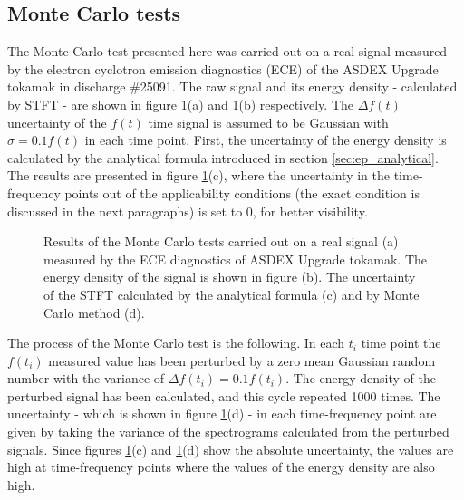 \documentclass[a4paper,12pt,oneside]{article}
\begin{document}
\subsection{Monte Carlo tests}
The Monte Carlo test presented here was carried out on a real signal measured by the electron cyclotron emission diagnostics (ECE) of the ASDEX Upgrade tokamak in discharge \#25091. The raw signal and its energy density - calculated by STFT - are shown in figure \ref{fig:gauss_error_test_freq}(a) and \ref{fig:gauss_error_test_freq}(b) respectively. The $\Delta f(t)$ uncertainty of the $f(t)$ time signal is assumed to be Gaussian with $\sigma = 0.1 f(t)$ in each time point. First, the uncertainty of the energy density is calculated by the analytical formula introduced in section \ref{sec:ep_analytical}. The results are presented in figure \ref{fig:gauss_error_test_freq}(c), where the uncertainty in the time-frequency points out of the applicability conditions (the exact condition is discussed in the next paragraphs) is set to $0$, for better visibility.
\begin{figure}[htb!]
  \centerline{}
  \caption{\label{fig:gauss_error_test_freq} Results of the Monte Carlo tests carried out on a real signal (a) measured by the ECE diagnostics of ASDEX Upgrade tokamak. The energy density of the signal is shown in figure (b). The uncertainty of the STFT calculated by the analytical formula (c) and by Monte Carlo method (d).}
\end{figure}

The process of the Monte Carlo test is the following. In each $t_i$ time point the $f(t_i)$ measured value has been perturbed by a zero mean Gaussian random number with the variance of $\Delta f(t_i) = 0.1 f(t_i)$. The energy density of the perturbed signal has been calculated, and this cycle repeated 1000 times. The uncertainty -  which is shown in figure \ref{fig:gauss_error_test_freq}(d) - in each time-frequency point are given by taking the variance of the spectrograms calculated from the perturbed signals. Since figures \ref{fig:gauss_error_test_freq}(c) and \ref{fig:gauss_error_test_freq}(d) show the absolute uncertainty, the values are high at time-frequency points where the values of the energy density are also high.
\end{document}
